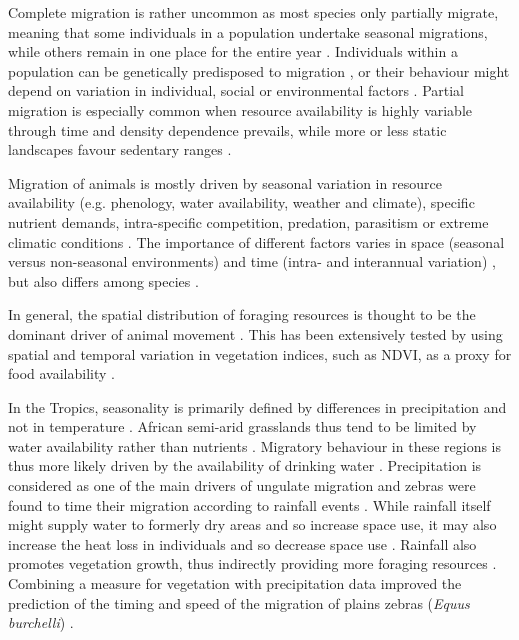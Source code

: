 \documentclass[12pt,a4paper, twoside, english]{article}
\begin{document}
Complete migration is rather uncommon as most species only partially migrate, meaning that some individuals in a population undertake seasonal migrations, while others remain in one place for the entire year \citep{Dingle2007, Chapman2011}. Individuals within a population can be genetically predisposed to migration \citep{Berthold1981}, or their behaviour might depend on variation in individual, social or environmental factors \citep{White2007a, Barton2015}. Partial migration is especially common when resource availability is highly variable through time and density dependence prevails, while more or less static landscapes favour sedentary ranges \citep{Taylor2007b, Mueller2008, Mueller2011, Boettiger2015}.

Migration of animals is mostly driven by seasonal variation in resource availability (e.g. phenology, water availability, weather and climate), specific nutrient demands, intra-specific competition, predation, parasitism or extreme climatic conditions \citep{Fryxell1988, Alerstam2003, Bolger2008}. The importance of different factors varies in space (seasonal versus non-seasonal environments) \citep{DeKnegt2011} and time (intra- and interannual variation) \citep{Boone2006}, but also differs among species \citep{Singh2010}. 

In general, the spatial distribution of foraging resources is thought to be the dominant driver of animal movement \citep{Berger2004, Schweiger2015}. This has been extensively tested by using spatial and temporal variation in vegetation indices, such as NDVI, as a proxy for food availability \citep{Fryxell2005, Pettorelli2005, Hebblewhite2008, Mueller2008a, Boettiger2015, Trierweiler2013, Bohrer2014, Bartlam-Brooks2013, Neumann2015a, Teitelbaum2015}.

In the Tropics, seasonality is primarily defined by differences in precipitation and not in temperature \citep{Naidoo2012}. African semi-arid grasslands thus tend to be limited by water availability rather than nutrients \citep{Breman1983}. Migratory behaviour in these regions is thus more likely driven by the availability of drinking water \citep{deBeer2008, Redfern2005}. Precipitation is considered as one of the main drivers of ungulate migration \citep{Bolger2008, Harris2009} and zebras were found to time their migration according to rainfall events \citep{Bartlam-Brooks2011, Naidoo2014}. While rainfall itself might supply water to formerly dry areas and so increase space use, it may also increase the heat loss in individuals and so decrease space use \citep{Rivrud2010, vanBeest2011}. Rainfall also promotes vegetation growth, thus indirectly providing more foraging resources \citep{Okitsu2005}. Combining a measure for vegetation with precipitation data improved the prediction of the timing and speed of the migration of plains zebras (\textit{Equus burchelli}) \citep{Bartlam-Brooks2013}.
\end{document}
